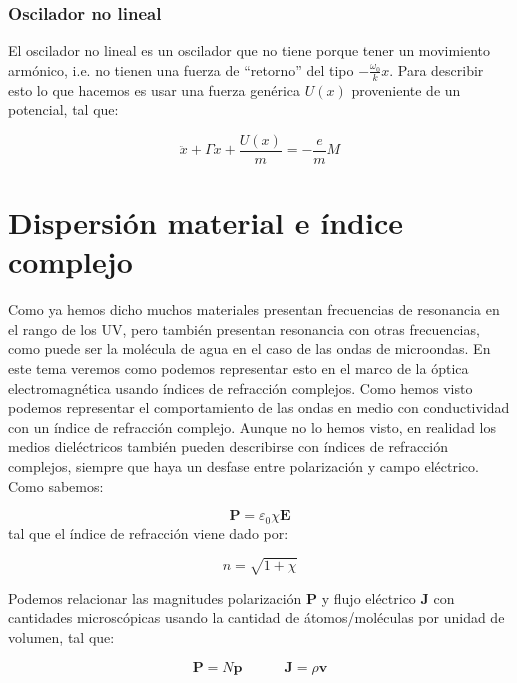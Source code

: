 \documentclass[12pt]{article}
\newcommand{\tquad}{\quad \quad \quad}
\newcommand{\En}{\mathbf{E}}
\newcommand{\Jn}{\mathbf{J}}
\newcommand{\vn}{\mathbf{v}}
\newcommand{\Pn}{\mathbf{P}}
\newcommand{\pn}{\mathbf{p}}
\numberwithin{equation}{section}
\numberwithin{figure}{section}
\begin{document}
\subsubsection{Oscilador no lineal}

El oscilador no lineal es un oscilador que no tiene porque tener un movimiento armónico, i.e. no tienen una fuerza de ``retorno'' del tipo $-\frac{\omega_0}{k}x$. Para describir esto lo que hacemos es usar una fuerza genérica $U(x)$ proveniente de un potencial, tal que:

\begin{equation}
\ddot{x} + \Gamma \dot{x} + \dfrac{U(x)}{m} = - \dfrac{e}{m}M 
\end{equation}


 \newpage

\section{Dispersión material e índice complejo}

Como ya hemos dicho muchos materiales presentan frecuencias de resonancia en el rango de los UV, pero también presentan resonancia con otras frecuencias, como puede ser la molécula de agua en el caso de las ondas de microondas. En este tema veremos como podemos representar esto en el marco de la óptica electromagnética usando índices de refracción complejos. Como hemos visto podemos representar el comportamiento de las ondas en medio con conductividad con un índice de refracción complejo. Aunque no lo hemos visto, en realidad los medios dieléctricos también pueden describirse con índices de refracción complejos, siempre que haya un desfase entre polarización y campo eléctrico. Como sabemos:

\begin{equation}
\Pn = \varepsilon_0 \chi \En \label{Ec:8.0.0.01}
\end{equation}
tal que el índice de refracción viene dado por:

\begin{equation}
n = \sqrt{1+\chi}
\end{equation}

Podemos relacionar las magnitudes polarización $\Pn$ y flujo eléctrico $\Jn$ con cantidades microscópicas usando la cantidad de átomos/moléculas por unidad de volumen, tal que:

\begin{equation}
\Pn = N \pn \tquad \Jn = \rho \vn \label{Ec:8.0.0.04}
\end{equation}
\end{document}
